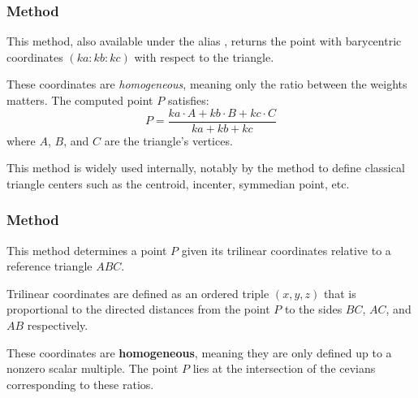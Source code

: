 \subsubsection{Method }
\label{ssub:_triangle_barycentric_ka_kb_kc}

This method, also available under the alias , returns the point with barycentric coordinates $(ka : kb : kc)$ with respect to the triangle.

\medskip
\noindent
These coordinates are \emph{homogeneous}, meaning only the ratio between the weights matters. The computed point $P$ satisfies:
\[
P = \frac{ka \cdot A + kb \cdot B + kc \cdot C}{ka + kb + kc}
\]
where $A$, $B$, and $C$ are the triangle's vertices.

\medskip
\noindent
This method is widely used internally, notably by the  method to define classical triangle centers such as the centroid, incenter, symmedian point, etc.


\vspace{1em}

\begin{tkzexample}[latex=.5\textwidth]
\end{tkzexample}

\subsubsection{Method }
\label{ssub:method_triangle_trilinear_x_y_z}

This method determines a point $P$ given its trilinear coordinates relative to a reference triangle $ABC$.

\medskip
\noindent
Trilinear coordinates are defined as an ordered triple $(x, y, z)$ that is proportional to the directed distances from the point $P$ to the sides $BC$, $AC$, and $AB$ respectively.

\medskip
\noindent
These coordinates are \textbf{homogeneous}, meaning they are only defined up to a nonzero scalar multiple. The point $P$ lies at the intersection of the cevians corresponding to these ratios.

